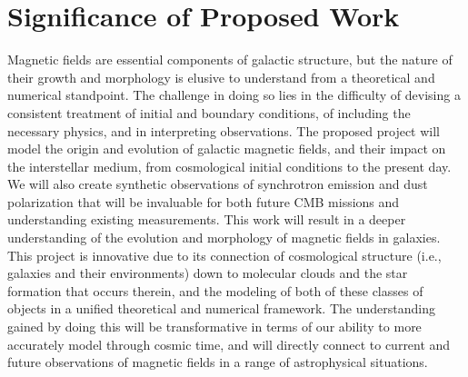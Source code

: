 \vspace{-4mm}
\section{Significance of Proposed Work}
\vspace{-3mm}

Magnetic fields are essential components of galactic structure, but
the nature of their growth and morphology is elusive to understand
from a theoretical and numerical standpoint.  The challenge in doing
so lies in the difficulty of devising a consistent treatment of
initial and boundary conditions, of including the necessary physics,
and in interpreting observations.  The proposed project will model the
origin and evolution of galactic magnetic fields, and their impact on
the interstellar medium, from cosmological initial conditions to
the present day.  We will also create synthetic observations 
of synchrotron emission and dust polarization that will be invaluable for both future
CMB missions  and understanding existing measurements.
This work will
result in a deeper understanding of the evolution and morphology of magnetic
fields in galaxies.
This project is innovative due to its connection of
cosmological structure (i.e., galaxies and their environments) down to
molecular clouds and the star formation that occurs therein, and the
modeling of both of these classes of objects in a unified theoretical
and numerical framework.  
The understanding gained by doing this will
be transformative in terms of our ability to more accurately model
 through cosmic time, and will directly connect to
current and future observations of magnetic fields in a range of
astrophysical situations.

